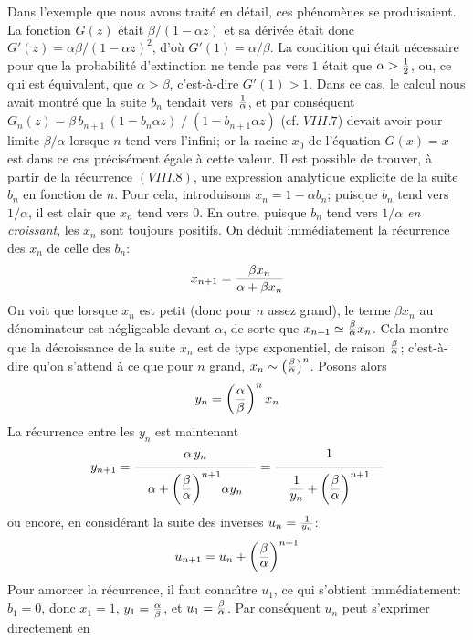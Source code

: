 \medskip
Dans l'exemple que nous avons trait\'e en d\'etail, ces ph\'enom\`enes 
se produisaient. La fonction $G(z)$ \'etait $\beta / (1 - \alpha z)$ et sa
d\'eriv\'ee \'etait donc $G'(z) = \alpha\beta / (1 - \alpha z)^2$, d'o\`u
$G'(1) = \alpha /\beta$. La condition qui \'etait n\'ecessaire pour que la
probabilit\'e d'extinction ne tende pas vers $1$ \'etait que $\alpha >
{1\over 2}$, ou, ce qui est \'equivalent, que $\alpha > \beta$,
c'est-\`a-dire $G'(1) > 1$. Dans ce cas, le calcul nous avait montr\'e que 
la suite $b_n$ tendait vers $1\over\textdown\alpha$, et par
cons\'equent $G_n(z) = \beta\, b_{n+1}\, (1 - b_n\alpha z)\; /\; (1 -
b_{n+1}\alpha z)$ (cf. $VIII.7$) devait avoir pour limite $\beta / 
\alpha$ lorsque $n$ tend vers l'infini; or la racine $x_0$ de l'\'equation
$G(x) = x$ est dans  ce cas pr\'ecis\'ement \'egale \`a cette valeur.
\bigskip
Il est possible de trouver, \`a partir de la r\'ecurrence $(VIII.8)$, une 
expression analytique explicite de la suite $b_n$ en fonction de $n$. 
Pour cela, introduisons $x_n = 1-\alpha b_n$; puisque $b_n$ tend vers 
 $1 / \alpha$, il est clair que $x_n$ tend vers 0. En outre, puisque $b_n$
tend vers  $1 / \alpha$ {\it en croissant}, les $x_n$ sont toujours
positifs. On d\'eduit imm\'ediatement la r\'ecurrence des $x_n$ de celle
des $b_n$: 
$$x_{n+1} = {\beta x_n \over \alpha + \beta x_n}$$
On voit que lorsque $x_n$ est petit (donc pour $n$ assez grand), le terme 
$\beta x_n$ au d\'enominateur est n\'egligeable devant $\alpha$, de 
sorte que $x_{n+1} \simeq {\beta\strup{1.7}\over\textdown
\alpha}x_n$. Cela montre que  la d\'ecroissance de la suite $x_n$ est de
type exponentiel, de raison ${\beta\strup{1.7}\over\textdown
\alpha}$; c'est-\`a-dire qu'on s'attend \`a ce que  pour $n$ grand, $x_n
\sim \big( {\beta\strup{1.7}\over\textdown\alpha} \big)^n$. 
Posons alors  
$$y_n =  \bigg( {\alpha\over\beta} \bigg)^n\, x_n$$
La r\'ecurrence entre les $y_n$ est maintenant
$$y_{n+1} = {\strup{7} \alpha\, y_n \over \quad\sdown{19}{\displaystyle 
\alpha + \bigg(  {\beta \over \ldown \alpha} \bigg)^{n+1}\alpha
y_n}\quad } = {\strup{7} 1 \over \quad \sdown{19} {\displaystyle
{1\over\ldown{y_n}}  +  \bigg( {\beta\over \ldown\alpha} \bigg)^{n+1}}
\quad }$$   
ou encore, en consid\'erant la suite des inverses $u_n = {1
\over\textdown{y_n}}$:   
$$u_{n+1} = u_n + \bigg( {\beta\over\ldown\alpha} \bigg)^{n+1}$$  
Pour amorcer la r\'ecurrence, il faut conna{\^\i}tre $u_1$, ce qui 
s'obtient imm\'e\-dia\-te\-ment: $b_1=0$, donc $x_1=1$, $y_1=
{\alpha\over\beta}$, et $u_1 = {\beta\strup{1.7}\over\textdown
\alpha}$.  Par cons\'equent $u_n$ peut s'exprimer directement en 
